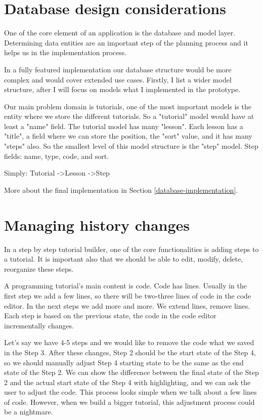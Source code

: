 \documentclass[11pt, a4paper, oneside, openright, medskipamount]{report}
\begin{document}
\section{Database design considerations} \label{database-design}

One of the core element of an application is the database and model layer. Determining data entities are an important step of the planning process and it helps us in the implementation process.

In a fully featured implementation our database structure would be more complex and would cover extended use cases. Firstly, I list a wider model structure, after I will focus on models what I implemented in the prototype.

Our main problem domain is tutorials, one of the most important models is the entity where we store the different tutorials. So a "tutorial" model would have at least a "name" field. The tutorial model has many "lesson". Each lesson has a "title", a field where we can store the position, the "sort" value, and it has many "steps" also. So the smallest level of this model structure is the "step" model. Step fields: name, type, code, and sort.

Simply: Tutorial -\textgreater Lesson -\textgreater Step

More about the final implementation in Section \ref{database-implementation}.

\section{Managing history changes} \label{history}

In a step by step tutorial builder, one of the core functionalities is adding steps to a tutorial. It is important also that we should be able to edit, modify, delete, reorganize these steps.

A programming tutorial’s main content is code. Code has lines. Usually in the first step we add a few lines, so there will be two-three lines of code in the code editor. In the next steps we add more and more. We extend lines, remove lines. Each step is based on the previous state, the code in the code editor incrementally changes.

Let's say we have 4-5 steps and we would like to remove the code what we saved in the Step 3. After these changes, Step 2 should be the start state of the Step 4, so we should manually adjust Step 4 starting state to be the same as the end state of the Step 2. We can show the difference between the final state of the Step 2 and the actual start state of the Step 4 with highlighting, and we can ask the user to adjust the code. This process looks simple when we talk about a few lines of code. However, when we build a bigger tutorial, this adjustment process could be a nightmare.
\end{document}
